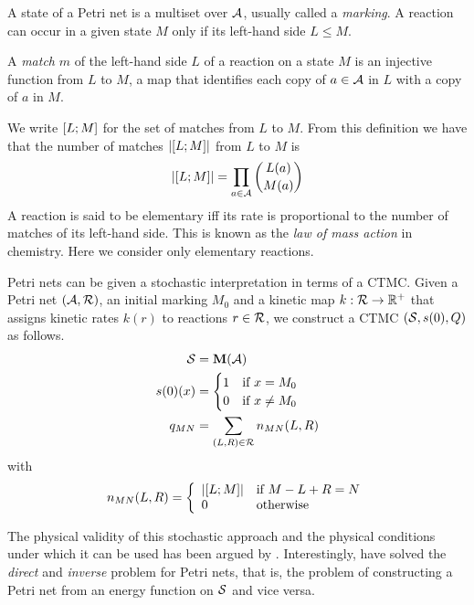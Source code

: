 A state of a Petri net is a multiset over $\mathcal{A}$,
usually called a \emph{marking}.
A reaction can occur in a given state $M$ only if
its left-hand side $L \leqslant M$.

\begin{definition}
  A \emph{match} $m$ of the left-hand side $L$ of a reaction
  on a state $M$ is an injective function from $L$ to $M$,
  \ie a map that identifies each copy of $a \in \mathcal{A}$ in $L$
  with a copy of $a$ in $M$.
\end{definition}

We write $\left[L;M\right]$ for the set of matches from $L$ to $M$.
From this definition we have that the number of matches
$\left\lvert \left[L;M\right] \right\rvert$ from $L$ to $M$ is
\[ \left\lvert \left[L;M\right] \right\rvert = \prod_{a \in \mathcal{A}} \binom{L(a)}{M(a)} \]
A reaction is said to be elementary iff its rate is
proportional to the number of matches of its left-hand side.
This is known as the \emph{law of mass action} in chemistry.
Here we consider only elementary reactions.

Petri nets can be given a stochastic interpretation
in terms of a CTMC.
Given a Petri net $\left(\mathcal{A}, \mathcal{R}\right)$,
an initial marking $M_0$ and
a kinetic map $k: \mathcal{R} \to \mathbb{R}^+$ that assigns
kinetic rates $k(r)$ to reactions $r \in \mathcal{R}$,
we construct a CTMC $\left(\mathcal{S}, s(0), Q\right)$ as follows.
\begin{align*}
  \mathcal{S} &{} = \mathbf{M}(\mathcal{A}) \\
  s(0)(x) &{} = \begin{cases}
    1 \quad\text{if } x = M_0 \\
    0 \quad\text{if } x \neq M_0
  \end{cases} \\
  q_{MN} &{} = \sum_{\left(L,R\right) \in \mathcal{R}} n_{MN}(L,R)
\end{align*}
with
\begin{equation*}
  n_{MN}(L,R) = \left\{\begin{array}{ll}
    \left\lvert \left[L;M\right] \right\rvert & \text{if } M - L + R = N \\
    0 & \text{otherwise}
  \end{array}\right.
\end{equation*}

The physical validity of this stochastic approach
and the physical conditions under which
it can be used has been argued by \citet{gillespie76}.
Interestingly, \citet{et2} have solved
the \emph{direct} and \emph{inverse} problem for Petri nets,
that is, the problem of constructing a Petri net
from an energy function on $\mathcal{S}$ and vice versa.

